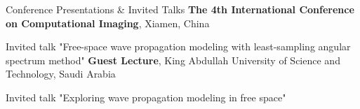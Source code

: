 \begin{rubric}{Conference Presentations \& Invited Talks}
    \entry*[2024/09] \textbf{The 4th International Conference on Computational Imaging}, Xiamen, China
    \par Invited talk "Free-space wave propagation modeling with least-sampling angular spectrum method"
    \entry*[2024/05] \textbf{Guest Lecture}, King Abdullah University of Science and Technology, Saudi Arabia
    \par Invited talk "Exploring wave propagation modeling in free space"
\end{rubric}
